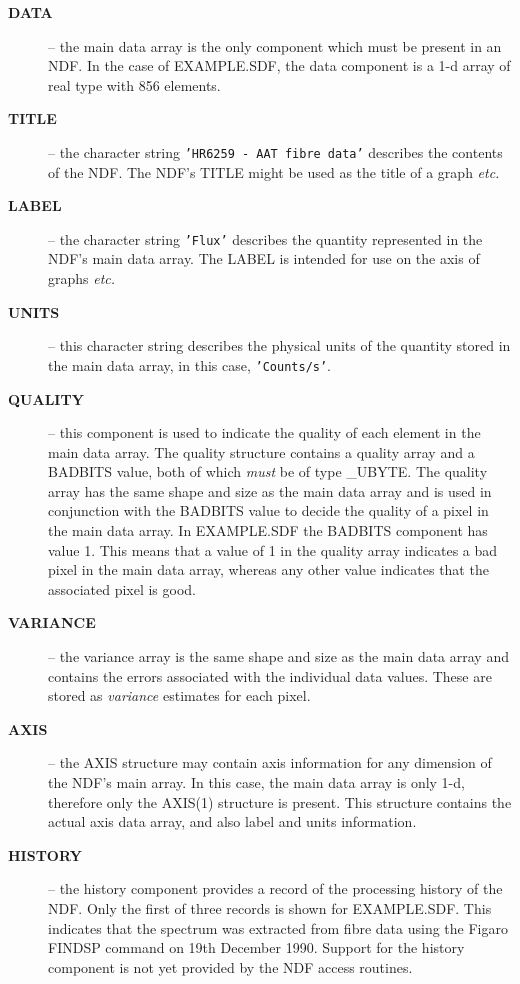 \begin{description}

\item[{\bf DATA}] -- the main data array is the only 
component which must be present in an NDF. 
In the case of EXAMPLE.SDF, the data component is a 1-d 
array of real type with 856 elements.

\item[{\bf TITLE}] -- the  character string {\tt'HR6259 - AAT fibre 
data'} describes the contents of the NDF. The NDF's TITLE
might be used as the title of a graph {\it etc.}

\item[{\bf LABEL}] -- the character string {\tt'Flux'} describes the
quantity represented in the NDF's main data array. The LABEL is
intended for use on the axis of graphs {\it etc.}

\item[{\bf UNITS}] -- this character string
describes the physical units of the quantity stored in the main data 
array, in this case, {\tt'Counts/s'}.

\item[{\bf QUALITY}] -- this component is used to indicate
the quality of each element in the main data array.
The quality structure contains a 
quality array and a BADBITS value, both of which {\sl must\/} be of 
type \_UBYTE.
The quality array has the same shape and size as
the main data array and is used in conjunction with the BADBITS value 
to decide the quality of a pixel in the main data array.
In EXAMPLE.SDF the BADBITS component has value 1.
This means that a value of 1 in the quality array indicates a bad pixel
in the main data array, whereas any other value indicates that 
the associated pixel is good.

\item[{\bf VARIANCE}] -- the variance array is the same shape and size
as the main data array and contains the errors 
associated with the individual data values. 
These are stored as {\sl variance\/} estimates for each
pixel. 

\item[{\bf AXIS}] -- the AXIS structure may contain axis information
for any dimension of the NDF's main array.
In this case, the main data array is only 1-d, therefore only the
AXIS(1) structure is present.
This structure contains the actual axis data array, and also 
label and units information.

\item[{\bf HISTORY}] -- the history component provides a record of
the processing history of the NDF.
Only the first of three records is shown for EXAMPLE.SDF. This indicates
that the spectrum was extracted from fibre data using the Figaro FINDSP
command on 19th December 1990.
Support for the history component is not yet provided by the NDF access 
routines.



\end{description}
